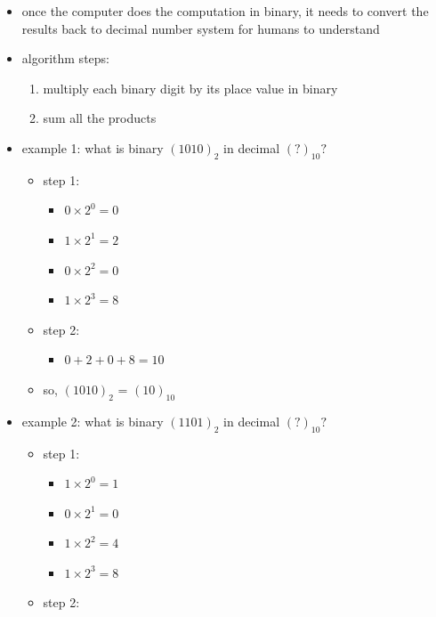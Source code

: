\documentclass[11pt]{article}
\providecommand{\tightlist}{%
      \setlength{\itemsep}{0pt}\setlength{\parskip}{0pt}}
\begin{document}
\begin{itemize}
\tightlist
\item
  once the computer does the computation in binary, it needs to convert
  the results back to decimal number system for humans to understand
\item
  algorithm steps:

  \begin{enumerate}
  \def\labelenumi{\arabic{enumi}.}
  \tightlist
  \item
    multiply each binary digit by its place value in binary
  \item
    sum all the products
  \end{enumerate}
\item
  example 1: what is binary \((1010)_2\) in decimal \((?)_{10}?\)

  \begin{itemize}
  \item
    step 1:

    \begin{itemize}
    \tightlist
    \item
      \(0\times2^0 = 0\)
    \item
      \(1\times2^1 = 2\)
    \item
      \(0\times2^2 = 0\)
    \item
      \(1\times2^3 = 8\)
    \end{itemize}
  \item
    step 2:

    \begin{itemize}
    \tightlist
    \item
      \(0 + 2 + 0 + 8 = 10\)
    \end{itemize}
  \item
    so, \((1010)_2\) = \((10)_{10}\)
  \end{itemize}
\item
  example 2: what is binary \((1101)_2\) in decimal \((?)_{10}?\)

  \begin{itemize}
  \item
    step 1:

    \begin{itemize}
    \tightlist
    \item
      \(1\times2^0 = 1\)
    \item
      \(0\times2^1 = 0\)
    \item
      \(1\times2^2 = 4\)
    \item
      \(1\times2^3 = 8\)
    \end{itemize}
  \item
    step 2:


\end{itemize}
\end{itemize}
\end{document}
